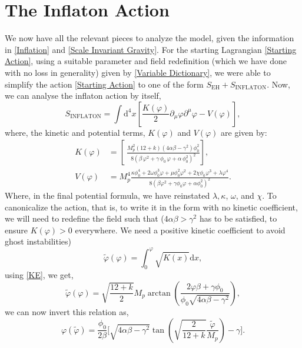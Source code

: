 \documentclass[aps,prd,reprint,preprintnumbers,showpacs,floatfix,nofootinbib,superscript address]{revtex4-2}
\begin{document}
\section{The Inflaton Action} \label{Solution}
We now have all the relevant pieces to analyze the model, given the information in \cref{Inflation}  and \cref{Scale Invariant Gravity}. For the starting Lagrangian \cref{Starting Action}, using a suitable parameter and field redefinition (which we have done with no loss in generality) given by \cref{Variable Dictionary}, we were able to simplify the action \cref{Starting Action} to one of the form $S_{\text{EH}} + S_{\text{INFLATON}}$. Now, we can analyse the inflaton action by itself,
\begin{equation}
    S_{\text{INFLATON}} = \int \text{d}^4x \left[ \frac{K(\varphi)}{2} \partial_\mu \varphi \partial^\mu \varphi - V(\varphi)\right],
\end{equation}
where, the kinetic and potential terms, $K(\varphi)$ and $V(\varphi)$ are given by:
\begin{align}
    K(\varphi) &= \left[\ \frac{M_p^2(12+k)(4\alpha\beta-\gamma^2) \phi_0^2}{8(\beta\,\varphi^2 + \gamma\,\phi_0\,\varphi + \alpha\,\phi_0^2)^2} \right], \label{KE} \\
    V(\varphi) &= M_p^4  \frac{ \kappa \phi_0^4 + 2\omega \phi_0^3 \varphi +\mu \phi^2_0 \varphi^2 + 2\chi \phi_0 \varphi^3 + \lambda \varphi^4 }{8(\beta \varphi^2 + \gamma\phi_0\varphi + \alpha \phi_0^2)^2}. \label{VE}
\end{align}
Where, in the final potential formula, we have reinstated $\lambda, \kappa$, $\omega$, and $\chi$. To canonicalize the action, that is, to write it in the form with no kinetic coefficient, we will need to redefine the field such that ($4\alpha \beta > \gamma^2$ has to be satisfied, to ensure $K(\varphi) > 0$ everywhere. We need a positive kinetic coefficient to avoid ghost instabilities)
\begin{equation} \label{40}
    \tilde{\varphi}(\varphi) = \int_0^{\varphi} \sqrt{K(x)} \text{d}x,
\end{equation}
using \cref{KE}, we get,
\begin{equation}
    \tilde{\varphi}(\varphi) = \sqrt{\frac{12+k}{2}}M_p \arctan \left( \frac{2\varphi\beta + \gamma \phi_0}{\phi_0\sqrt{4\alpha\beta - \gamma^2}} \right),
\end{equation}
we can now invert this relation as,
\begin{equation}
    \varphi(\tilde{\varphi}) = \frac{\phi_0}{2\beta} \Biggl[ \sqrt{4\alpha\beta - \gamma^2} \tan\left(\sqrt{\frac{2}{12+k}}\frac{\tilde{\varphi}}{M_p}\right) - \gamma \Biggr] .
\end{equation}
\end{document}
